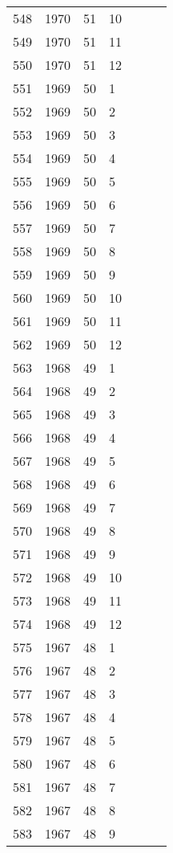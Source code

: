 \begin{longtable}{ |l|l|l|l|l|l|l| }
548 & 1970 & 51 & 10 &  &  &  \\
549 & 1970 & 51 & 11 &  &  &  \\
550 & 1970 & 51 & 12 &  &  &  \\
551 & 1969 & 50 & 1 &  &  &  \\
552 & 1969 & 50 & 2 &  &  &  \\
553 & 1969 & 50 & 3 &  &  &  \\
554 & 1969 & 50 & 4 &  &  &  \\
555 & 1969 & 50 & 5 &  &  &  \\
556 & 1969 & 50 & 6 &  &  &  \\
557 & 1969 & 50 & 7 &  &  &  \\
558 & 1969 & 50 & 8 &  &  &  \\
559 & 1969 & 50 & 9 &  &  &  \\
560 & 1969 & 50 & 10 &  &  &  \\
561 & 1969 & 50 & 11 &  &  &  \\
562 & 1969 & 50 & 12 &  &  &  \\
563 & 1968 & 49 & 1 &  &  &  \\
564 & 1968 & 49 & 2 &  &  &  \\
565 & 1968 & 49 & 3 &  &  &  \\
566 & 1968 & 49 & 4 &  &  &  \\
567 & 1968 & 49 & 5 &  &  &  \\
568 & 1968 & 49 & 6 &  &  &  \\
569 & 1968 & 49 & 7 &  &  &  \\
570 & 1968 & 49 & 8 &  &  &  \\
571 & 1968 & 49 & 9 &  &  &  \\
572 & 1968 & 49 & 10 &  &  &  \\
573 & 1968 & 49 & 11 &  &  &  \\
574 & 1968 & 49 & 12 &  &  &  \\
575 & 1967 & 48 & 1 &  &  &  \\
576 & 1967 & 48 & 2 &  &  &  \\
577 & 1967 & 48 & 3 &  &  &  \\
578 & 1967 & 48 & 4 &  &  &  \\
579 & 1967 & 48 & 5 &  &  &  \\
580 & 1967 & 48 & 6 &  &  &  \\
581 & 1967 & 48 & 7 &  &  &  \\
582 & 1967 & 48 & 8 &  &  &  \\
583 & 1967 & 48 & 9 &  &  &  \\

\end{longtable}
